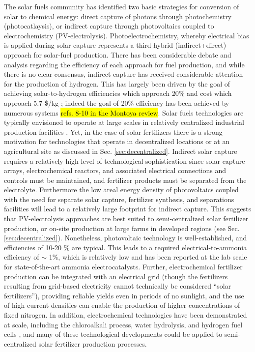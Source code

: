 The solar fuels community has identified two basic strategies for conversion of solar to chemical energy: direct capture of photons through photochemistry (photocatlaysis), or indirect capture through photovoltaics coupled to electrochemistry (PV-electrolysis)\cite{McDaniel_2010,Highfield_2015}. Photoelectrochemistry, whereby electrical bias is applied during solar capture represents a third hybrid (indirect+direct) approach for solar-fuel production. There has been considerable debate and analysis regarding the efficiency of each approach for fuel production\cite{Montoya_2017,Daviseaas9793,Lewis_2016,Herron_2015}, and while there is no clear consensus, indirect capture has received considerable attention for the production of hydrogen. This has largely been driven by the goal of achieving solar-to-hydrogen efficiencies which approach 20\% and cost which approach 5.7 \$/kg \needcite; indeed the goal of 20\% efficiency has been achieved by numerous systems \needcite \hl{refs. 8-10 in the Montoya review}. Solar fuels technologies are typically envisioned to operate at large scales in relatively centralized industrial production facilities \cite{Shaner_2016} \needcite. Yet, in the case of solar fertilizers there is a strong motivation for technologies that operate in decentralized locations or at an agricultural site as discussed in Sec. \ref{sec:decentralized}. Indirect solar capture requires a relatively high level of technological sophistication since solar capture arrays, electrochemical reactors, and associated electrical connections and controls must be maintained, and fertilizer products must be separated from the electrolyte. Furthermore the low areal energy density of photovoltaics \cite{MacKay_2013} coupled with the need for separate solar capture, fertilizer synthesis, and separations facilities will lead to a relatively large footprint for indirect capture. This suggests that PV-electrolysis approaches are best suited to semi-centralized solar fertilizer production, or on-site production at large farms in developed regions (see Sec. \ref{sec:decentralized}). Nonetheless, photovoltaic technology is well-established, and efficiencies of 10-20 \% are typical. This leads to a required electrical-to-ammonia efficiency of $\sim$ 1\%, which is relatively low and has been reported at the lab scale for state-of-the-art ammonia electrocatalysts.\cite{Liu2018,Qiu_2018,Song_2018,Zhang_2018,Luo_2018} Further, electrochemical fertilizer production can be integrated with an electrical grid (though the fertilizers resulting from grid-based electricity cannot technically be considered ``solar fertilizers''), providing reliable yields even in periods of no sunlight, and the use of high current densities can enable the production of higher concentrations of fixed nitrogen. In addition, electrochemical technologies have been demonstrated at scale, including the chloroalkali process, water hydrolysis, and hydrogen fuel cells\cite{Burney1993} \needcite, and many of these technological developments could be applied to semi-centralized solar fertilizer production processes.

